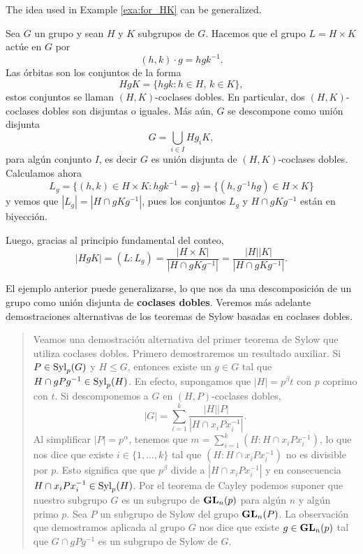 \chapter{}


The idea used in Example \ref{exa:for_HK} can be generalized. 

\begin{example}
Sea $G$ un grupo y sean $H$ y $K$ subgrupos de $G$. Hacemos
que el grupo $L=H\times K$ actúe en $G$ por
\[
(h,k)\cdot g=hgk^{-1}.
\]
Las órbitas son los conjuntos de la forma
\[
HgK=\{hgk:h\in H,\,k\in K\},
\]
estos conjuntos se llaman $(H,K)$-coclases dobles.
En particular, dos $(H,K)$-coclases dobles son disjuntas o iguales. Más aún,
$G$ se descompone como unión disjunta
\[
G=\bigcup_{i\in I}Hg_iK,
\]
para algún conjunto $I$, es decir $G$
es unión disjunta de $(H,K)$-coclases dobles.
Calculamos ahora
\[
L_g=\{(h,k)\in H\times K:hgk^{-1}=g\}=\{(h,g^{-1}hg)\in H\times K\}
\]
y vemos que $|L_g|=|H\cap gKg^{-1}|$, pues los conjuntos $L_g$ y $H\cap gKg^{-1}$ están en biyección.

Luego,
gracias al principio fundamental del conteo,
\[
|HgK|=(L:L_g)=\frac{|H\times K|}{|H\cap gKg^{-1}|}=\frac{|H||K|}{|H\cap gKg^{-1}|}.
\]
\end{example}

El ejemplo anterior puede generalizarse, lo que nos da una descomposición
de un grupo como unión disjunta de \textbf{coclases dobles}. Veremos más adelante
demostraciones alternativas de los teoremas de Sylow basadas en
coclases dobles.

\begin{quote}
Veamos una demostración alternativa del primer teorema de Sylow
que utiliza coclases dobles.
Primero demostraremos un resultado auxiliar. Si $P\in\mathrm{Syl}_p(G)$ y $H\leq G$, entonces
existe un $g\in G$ tal que $H\cap gPg^{-1}\in\mathrm{Syl}_p(H)$. En efecto, supongamos que
$|H|=p^\beta t$ con $p$ coprimo con $t$.
Si descomponemos a $G$ en $(H,P)$-coclases dobles,
\[
|G|=\sum_{i=1}^k \frac{|H||P|}{|H\cap x_iPx_i^{-1}|}.
\]
Al simplificar $|P|=p^\alpha$, tenemos que $m=\sum_{i=1}^k(H:H\cap x_iPx_i^{-1})$, lo que nos dice
que existe $i\in\{1,\dots,k\}$ tal que
$(H:H\cap x_iPx_i^{-1})$ no es divisible por $p$. Esto significa que que
$p^\beta$ divide a $|H\cap x_iPx_i^{-1}|$ y en consecuencia $H\cap x_iPx_i^{-1}\in\mathrm{Syl}_p(H)$.
Por el teorema de Cayley podemos suponer que nuestro subgrupo $G$ es un subgrupo
de $\mathbf{GL}_n(p)$ para algún $n$ y algún primo $p$. Sea $P$ un subgrupo de Sylow
del grupo $\mathbf{GL}_n(P)$. La observación que demostramos
aplicada al grupo $G$ nos dice que existe $g\in \mathbf{GL}_n(p)$ tal que $G\cap gPg^{-1}$ es un subgrupo de
Sylow de $G$.
\end{quote}

